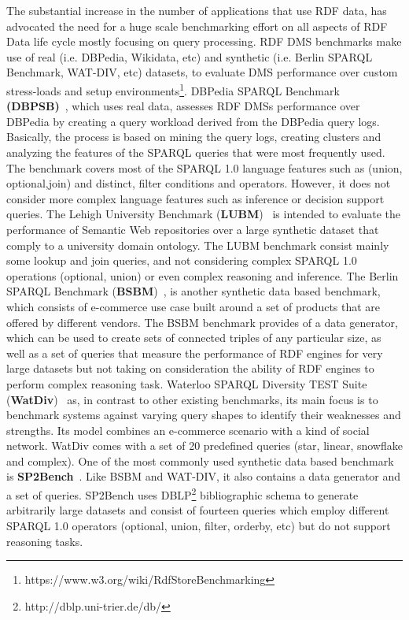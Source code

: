 \documentclass{llncs}
\begin{document}
    The substantial increase in the number of applications that use RDF data, has advocated the need for a huge scale benchmarking effort on all aspects of RDF Data life cycle mostly focusing on query processing\cite{ngomo2016hobbit}.
    RDF DMS benchmarks make use of real (i.e. DBPedia, Wikidata, etc) and synthetic (i.e. Berlin SPARQL Benchmark, WAT-DIV, etc) datasets, to evaluate DMS performance over custom stress-loads and setup environments\footnote{https://www.w3.org/wiki/RdfStoreBenchmarking}.
    DBPedia SPARQL Benchmark \textbf{(DBPSB)}~\cite{Morsey2011}, which uses real data, assesses RDF DMSs performance over DBPedia by creating a query workload derived from the DBPedia query logs. Basically, the process is based on mining the query logs, creating clusters and analyzing the features of the SPARQL queries that were most frequently used. The benchmark covers most of the SPARQL 1.0 language features such as (union, optional,join) and distinct, filter conditions and operators. However, it does not consider more complex language features such as inference or decision support queries.
    The Lehigh University Benchmark (\textbf{LUBM})~\cite{Guo:2005:LBO:1741305.1741322} is intended to evaluate the performance of Semantic Web repositories over a large synthetic dataset that comply to a university domain ontology.
    The LUBM benchmark consist mainly some lookup and join queries, and not considering complex SPARQL 1.0 operations (optional, union) or even complex reasoning and inference.
    The Berlin SPARQL Benchmark (\textbf{BSBM})~\cite{Bizer2009TheBS}, is another synthetic data based benchmark, which consists of e-commerce use case built around a set of products that are offered by different vendors.
    The BSBM benchmark provides of a data generator, which can be used to create sets of connected triples of any particular size, as well as a set of queries that measure the performance of RDF engines for very large datasets but not taking on consideration the ability of RDF engines to perform complex reasoning task.
    Waterloo SPARQL Diversity TEST Suite (\textbf{WatDiv})~\cite{alucc2014diversified} as, in contrast to other existing benchmarks, its main focus is to benchmark systems against varying query shapes to identify their weaknesses and strengths.
    Its model combines an e-commerce scenario with a kind of social network.
    WatDiv comes with a set of 20 predefined queries (star, linear, snowflake and complex). 
    One of the most commonly used synthetic data based benchmark is \textbf{SP2Bench}~\cite{books/sp/virgilio09/SchmidtHMPL09}. Like BSBM and WAT-DIV, it also contains a data generator and a set of queries. SP2Bench uses DBLP\footnote{http://dblp.uni-trier.de/db/} bibliographic schema to generate arbitrarily large datasets and consist of fourteen queries which employ different SPARQL 1.0 operators (optional, union, filter, orderby, etc) but do not support reasoning tasks.
   
\end{document}

